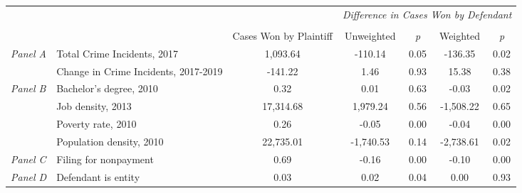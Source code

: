 \begin{tabular}{llccccc}
\toprule
 &  & \textit{} & \multicolumn{4}{c}{\textit{Difference in Cases Won by Defendant}} \\
\cline{4-7}
\\
 &  & Cases Won by Plaintiff & Unweighted & \emph{p} & Weighted & \emph{p} \\
\midrule
\multirow[c]{2}{.75cm}{\textit{Panel A}} & Total Crime Incidents, 2017 & 1,093.64 & -110.14 & 0.05 & -136.35 & 0.02 \\
 & Change in Crime Incidents, 2017-2019 & -141.22 & 1.46 & 0.93 & 15.38 & 0.38 \\
\cline{1-7}
\multirow[c]{4}{.75cm}{\textit{Panel B}} & Bachelor's degree, 2010 & 0.32 & 0.01 & 0.63 & -0.03 & 0.02 \\
 & Job density, 2013 & 17,314.68 & 1,979.24 & 0.56 & -1,508.22 & 0.65 \\
 & Poverty rate, 2010 & 0.26 & -0.05 & 0.00 & -0.04 & 0.00 \\
 & Population density, 2010 & 22,735.01 & -1,740.53 & 0.14 & -2,738.61 & 0.02 \\
\cline{1-7}
\textit{Panel C} & Filing for nonpayment & 0.69 & -0.16 & 0.00 & -0.10 & 0.00 \\
\cline{1-7}
\textit{Panel D} & Defendant is entity & 0.03 & 0.02 & 0.04 & 0.00 & 0.93 \\
\cline{1-7}
\bottomrule
\end{tabular}
